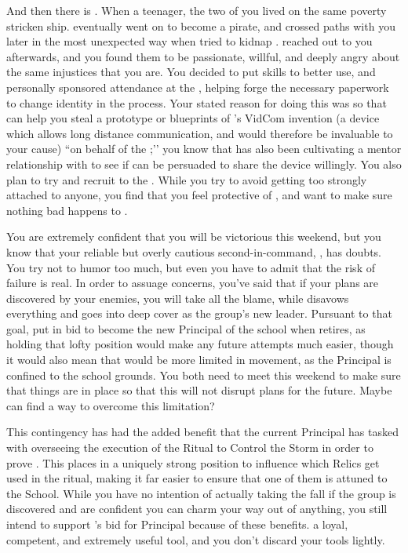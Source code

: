 \documentclass[char]{GL2020}
\begin{document}
And then there is \cPirateChild{}. When \cPirateChild{\theywere} a teenager, the two of you lived on the same poverty stricken ship. \cPirateChild{} eventually went on to become a pirate, and crossed paths with you later in the most unexpected way when \cPirateChild{\they} tried to kidnap \cHeadDiplomat{}. \cPirateChild{\They} reached out to you afterwards, and you found them to be passionate, willful, and deeply angry about the same injustices that you are. You decided to put \cPirateChild{\their} skills to better use, and personally sponsored \cPirateChild{\their} attendance at the \pSchool{}, helping \cPirateChild{\them} forge the necessary paperwork to change \cPirateChild{\their} identity in the process. Your stated reason for doing this was so that \cPirateChild{\they} can help you steal a prototype or blueprints of \cTechStar{\full}’s VidCom invention (a device which allows long distance communication, and would therefore be invaluable to your cause) ``on behalf of the \pShip{};’’ you know that \cChupInventor{} has also been cultivating a mentor relationship with \cTechStar{} to see if \cTechStar{\they} can be persuaded to share the device willingly. You also plan to try and recruit \cPirateChild{} to the \pGoaties{}. While you try to avoid getting too strongly attached to anyone, you find that you feel protective of \cPirateChild{\them}, and want to make sure nothing bad happens to \cPirateChild{\them}. 

You are extremely confident that you will be victorious this weekend, but you know that your reliable but overly cautious second-in-command, \cChupSecond{}, has doubts. You try not to humor \cChupSecond{\them} too much, but even you have to admit that the risk of failure is real. In order to assuage \cChupSecond{\their} concerns, you've said that if your plans are discovered by your enemies, you will take all the blame, while \cChupSecond{} disavows everything and goes into deep cover as the group's new leader. Pursuant to that goal, \cChupSecond{\they} put in \cChupSecond{\their} bid to become the new Principal of the school when \cPrincipal{\full} retires, as holding that lofty position would make any future attempts much easier, though it would also mean that \cChupSecond{} would be more limited in movement, as the Principal is confined to the school grounds. You both need to meet this weekend to make sure that things are in place so that this will not disrupt plans for the future. Maybe \cGenesis{} can find a way to overcome this limitation?

This contingency has had the added benefit that the current Principal has tasked \cChupSecond{} with overseeing the execution of the Ritual to Control the Storm in order to prove \cChupSecond{\themself}. This places \cChupSecond{\them} in a uniquely strong position to influence which Relics get used in the ritual, making it far easier to ensure that one of them is attuned to the School. While you have no intention of actually taking the fall if the group is discovered and are confident you can charm your way out of anything, you still intend to support \cChupSecond{}’s bid for Principal because of these benefits. \cChupSecond{\Theyare} a loyal, competent, and extremely useful tool, and you don’t discard your tools lightly.
\end{document}
